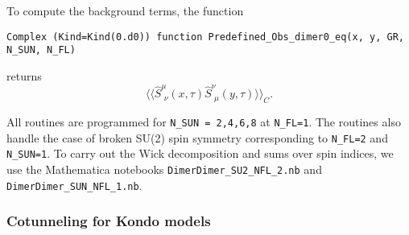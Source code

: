 To compute the background terms, the function
\begin{lstlisting}[style=fortran]
Complex (Kind=Kind(0.d0)) function Predefined_Obs_dimer0_eq(x, y, GR, N_SUN, N_FL)
\end{lstlisting}
returns 
\begin{equation}
\langle \langle \hat{S}^{\mu}_{\, \,  \nu} (x,\tau)   \hat{S}^{\nu}_{\, \,  \mu} (y,\tau)  \rangle   \rangle_C .
\end{equation} 

All routines  are programmed  for \texttt{N\_SUN = 2,4,6,8} at \texttt{N\_FL=1}.   The routines also handle the case of broken SU(2)  spin symmetry corresponding  to  \texttt{N\_FL=2}  and \texttt{N\_SUN=1}.   To carry out the Wick decomposition  and sums over  spin indices,  we use the  Mathematica  notebooks 
\texttt{Dimer\-Dimer\_SU2\_NFL\_2.nb}  and \texttt{Dimer\-Dimer\_SUN\_NFL\_1.nb}.


\subsubsection{Cotunneling for Kondo models}

